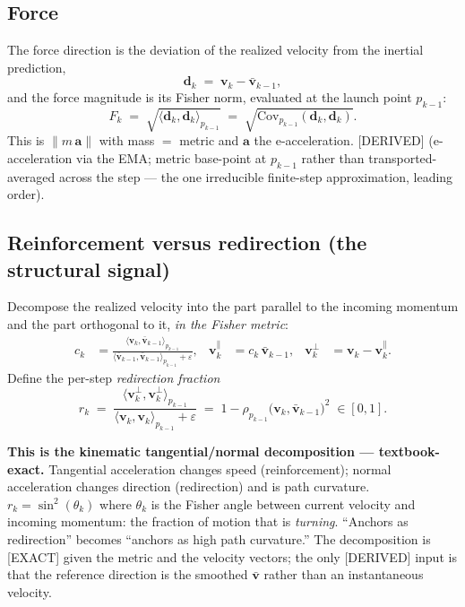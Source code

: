 \documentclass[11pt]{article}
\newcommand{\Cov}{\mathrm{Cov}}
\begin{document}
\subsection{Force}
The force direction is the deviation of the realized velocity from the inertial prediction,
\begin{equation}
  \bm{d}_k \;=\; \bm{v}_k - \bar{\bm{v}}_{k-1},
\end{equation}
and the force magnitude is its Fisher norm, evaluated at the launch point $p_{k-1}$:
\begin{equation}
  \boxed{\;F_k \;=\; \sqrt{\langle \bm{d}_k, \bm{d}_k\rangle_{p_{k-1}}}
  \;=\; \sqrt{\Cov_{p_{k-1}}(\bm{d}_k,\bm{d}_k)}.\;}
  \label{eq:force}
\end{equation}
This is $\lVert m\,\bm{a}\rVert$ with mass $=$ metric and $\bm{a}$ the e-acceleration. \textsf{[DERIVED]} (e-acceleration via the EMA; metric base-point at $p_{k-1}$ rather than transported-averaged across the step --- the one irreducible finite-step approximation, leading order).

\subsection{Reinforcement versus redirection (the structural signal)}
Decompose the realized velocity into the part parallel to the incoming momentum and the part orthogonal to it, \emph{in the Fisher metric}:
\begin{align}
  c_k &= \frac{\langle \bm{v}_k, \bar{\bm{v}}_{k-1}\rangle_{p_{k-1}}}{\langle \bar{\bm{v}}_{k-1}, \bar{\bm{v}}_{k-1}\rangle_{p_{k-1}} + \varepsilon},
  &\bm{v}_k^{\parallel} &= c_k\,\bar{\bm{v}}_{k-1},
  &\bm{v}_k^{\perp} &= \bm{v}_k - \bm{v}_k^{\parallel}.
  \label{eq:decomp}
\end{align}
Define the per-step \emph{redirection fraction}
\begin{equation}
  \boxed{\;r_k \;=\; \frac{\langle \bm{v}_k^{\perp}, \bm{v}_k^{\perp}\rangle_{p_{k-1}}}{\langle \bm{v}_k, \bm{v}_k\rangle_{p_{k-1}}+\varepsilon}
  \;=\; 1 - \rho_{p_{k-1}}\!\big(\bm{v}_k, \bar{\bm{v}}_{k-1}\big)^2 \;\in[0,1].\;}
  \label{eq:redir}
\end{equation}

\begin{honestbox}
\textbf{This is the kinematic tangential/normal decomposition --- textbook-exact.} Tangential acceleration changes speed (reinforcement); normal acceleration changes direction (redirection) and is path curvature. $r_k=\sin^2(\theta_k)$ where $\theta_k$ is the Fisher angle between current velocity and incoming momentum: the fraction of motion that is \emph{turning}. ``Anchors as redirection'' becomes ``anchors as high path curvature.'' The decomposition is \textsf{[EXACT]} given the metric and the velocity vectors; the only \textsf{[DERIVED]} input is that the reference direction is the smoothed $\bar{\bm{v}}$ rather than an instantaneous velocity.
\end{honestbox}
\end{document}
